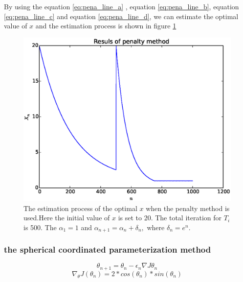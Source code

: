\documentclass[a4paper,12pt]{article}
\begin{document}
By using the equation \ref{eq:pena_line_a} , equation \ref{eq:pena_line_b},  equation \ref{eq:pena_line_c}  and equation \ref{eq:pena_line_d}, we can estimate the optimal value of $x$ and the estimation process is shown in figure \ref{fig:line_result}\\

\begin{figure}[H]
\begin{center}
\includegraphics[width=1.0\linewidth]{line_est.eps}


\end{center}
   \caption{The estimation process of the optimal $x$ when the penalty method is used.Here the initial value of $x$ is set to 20. The total iteration for $T_i$ is 500. The $\alpha_1 = 1$ and $\alpha _{n+1} = \alpha _n + \delta_n,$ where $\delta _ n=e^n$. }
\label{fig:line_result}
\end{figure}


\subsubsection{the spherical coordinated parameterization method }

\begin{equation} \label{eq:sphe_line_a}
\theta_{n+1}=\theta_n-\epsilon _n \nabla J{\theta_ n}
\end{equation}
\begin{equation}\label{eq:sphe_line_b}
\nabla _{\theta} J(\theta_n) = 2*cos(\theta_n)*sin(\theta_n)
\end{equation}
\end{document}

